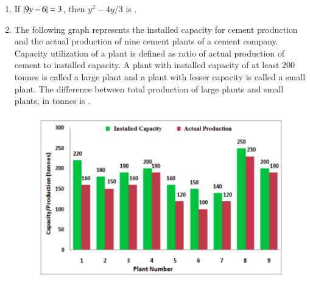 \documentclass[journal,12pt,onecolumn]{IEEEtran}
\theoremstyle{remark}
\begin{document}
\begin{enumerate}[start=1, label=Q.\arabic*]
    \hfill{}

    \item If $\left\vert9y-6\right\vert = 3$, then $y^2 - 4y/3$ is \underline{\hspace{2cm}}.
    \begin{enumerate}
    \end{enumerate}

    \hfill{}

    \item The following graph represents the installed capacity for cement production  and the actual production  of nine cement plants of a cement company. Capacity utilization of a plant is defined as ratio of actual production of cement to installed capacity. A plant with installed capacity of at least $200$ tonnes is called a large plant and a plant with lesser capacity is called a small plant. The difference between total production of large plants and small plants, in tonnes is \underline{\hspace{2cm}}.
    \begin{figure}[H]
        \includegraphics[width=0.7\columnwidth]{Figures/2q6.png}
        \centering
        \caption{}
        
    \end{figure}

    \hfill{}


\end{enumerate}
\end{document}
